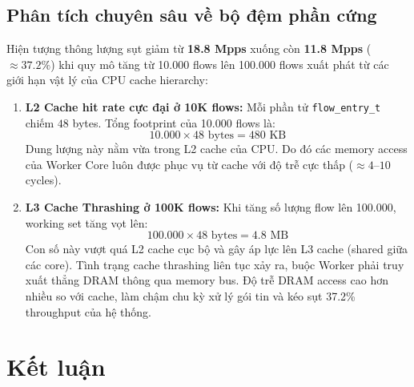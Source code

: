 \documentclass[12pt,a4paper,twoside]{report}
\begin{document}
\section{Phân tích chuyên sâu về bộ đệm phần cứng}
Hiện tượng thông lượng sụt giảm từ \textbf{18.8 Mpps} xuống còn \textbf{11.8 Mpps} ($\approx 37.2\%$) khi quy mô tăng từ 10.000 flows lên 100.000 flows xuất phát từ các giới hạn vật lý của CPU cache hierarchy:
\begin{enumerate}
    \item \textbf{L2 Cache hit rate cực đại ở 10K flows:}
    Mỗi phần tử \texttt{flow\_entry\_t} chiếm $48$ bytes. Tổng footprint của 10.000 flows là:
    $$10.000 \times 48 \text{ bytes} = 480 \text{ KB}$$
    Dung lượng này nằm vừa trong L2 cache của CPU. Do đó các memory access của Worker Core luôn được phục vụ từ cache với độ trễ cực thấp ($\approx 4$--$10$ cycles).
    \item \textbf{L3 Cache Thrashing ở 100K flows:}
    Khi tăng số lượng flow lên 100.000, working set tăng vọt lên:
    $$100.000 \times 48 \text{ bytes} = 4.8 \text{ MB}$$
    Con số này vượt quá L2 cache cục bộ và gây áp lực lên L3 cache (shared giữa các core). Tình trạng cache thrashing liên tục xảy ra, buộc Worker phải truy xuất thẳng DRAM thông qua memory bus. Độ trễ DRAM access cao hơn nhiều so với cache, làm chậm chu kỳ xử lý gói tin và kéo sụt 37.2\% throughput của hệ thống.
\end{enumerate}

\newpage
\chapter{Kết luận}
\end{document}
